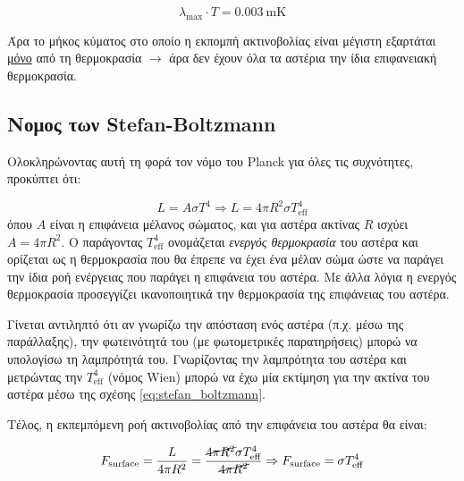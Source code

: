 \begin{equation}
    \boxed{\lambda_{\text{max}} \cdot T = 0.003 \ \text{mK}}
\end{equation}

Άρα το μήκος κύματος στο οποίο η εκπομπή ακτινοβολίας είναι μέγιστη εξαρτάται \underline{μόνο} από τη θερμοκρασία $\longrightarrow$ άρα δεν έχουν όλα τα αστέρια την ίδια επιφανειακή θερμοκρασία.

\subsection{Νομος των Stefan-Boltzmann}
Ολοκληρώνοντας αυτή τη φορά τον νόμο του Planck για όλες τις συχνότητες, προκύπτει ότι:

\begin{equation}
    \label{eq:stefan_boltzmann}
    L = A \sigma T^4 \Rightarrow \boxed{L = 4 \pi R^2 \sigma T_{\text{eff}}^4}
\end{equation}
όπου $A$ είναι η επιφάνεια μέλανος σώματος, και για αστέρα ακτίνας $R$ ισχύει $A=4\pi R^2$. Ο παράγοντας $T_{\text{eff}}^4$ ονομάζεται \textit{ενεργός θερμοκρασία} του αστέρα και ορίζεται ως η θερμοκρασία που θα έπρεπε να έχει ένα μέλαν σώμα ώστε να παράγει την ίδια ροή ενέργειας που παράγει η επιφάνεια του αστέρα. Με άλλα λόγια η ενεργός θερμοκρασία προσεγγίζει ικανοποιητικά την θερμοκρασία της επιφάνειας του αστέρα.

Γίνεται αντιληπτό ότι αν γνωρίζω την απόσταση ενός αστέρα (π.χ. μέσω της παράλλαξης), την φωτεινότητά του (με φωτομετρικές παρατηρήσεις) μπορώ να υπολογίσω τη λαμπρότητά του. Γνωρίζοντας την λαμπρότητα του αστέρα και μετρώντας την $T_{\text{eff}}^4$ (νόμος Wien) μπορώ να έχω μία εκτίμηση για την ακτίνα του αστέρα μέσω της σχέσης \eqref{eq:stefan_boltzmann}.

Τέλος, η εκπεμπόμενη ροή ακτινοβολίας από την επιφάνεια του αστέρα θα είναι:

\begin{eqnarray}
    F_{\text{surface}} = \frac{L}{4 \pi R^2} = \frac{\cancel{4 \pi R^2} \sigma T_{\text{eff}}^4}{\cancel{4 \pi R^2}} \Rightarrow F_{\text{surface}} = \sigma T_{\text{eff}}^4
\end{eqnarray}